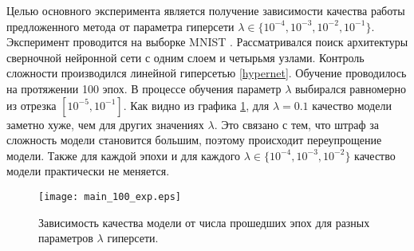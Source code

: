 \documentclass[12pt, twoside]{article}
\begin{document}
Целью основного эксперимента является получение зависимости качества работы предложенного метода от параметра гиперсети $\lambda \in \{10^{-4}, 10^{-3}, 10^{-2}, 10^{-1}\}$. Эксперимент проводится на выборке MNIST \cite{lecun-mnisthandwrittendigit-2010}. Рассматривался поиск архитектуры сверночной нейронной сети с одним слоем и четырьмя узлами. Контроль сложности производился линейной гиперсетью \ref{hypernet}. Обучение проводилось на протяжении 100 эпох. В процессе обучения параметр $\lambda$ выбирался равномерно из отрезка $[10^{-5}, 10^{-1}]$. Как видно из графика \ref{fig:main_exp}, для $\lambda = 0.1$ качество модели заметно хуже, чем для других значениях $\lambda$. Это связано с тем, что штраф за сложность модели становится большим, поэтому происходит переупрощение модели. Также для каждой эпохи и для каждого $\lambda \in \{10^{-4}, 10^{-3}, 10^{-2}\}$ качество модели практически не меняется.

\begin{figure}[H]
\centering
  \texttt{[image: main\_100\_exp.eps]}
  \caption{Зависимость качества модели от числа прошедших эпох для разных параметров $\lambda$ гиперсети.}
  \label{fig:main_exp}
\end{figure}

 

\newpage

\end{document}
